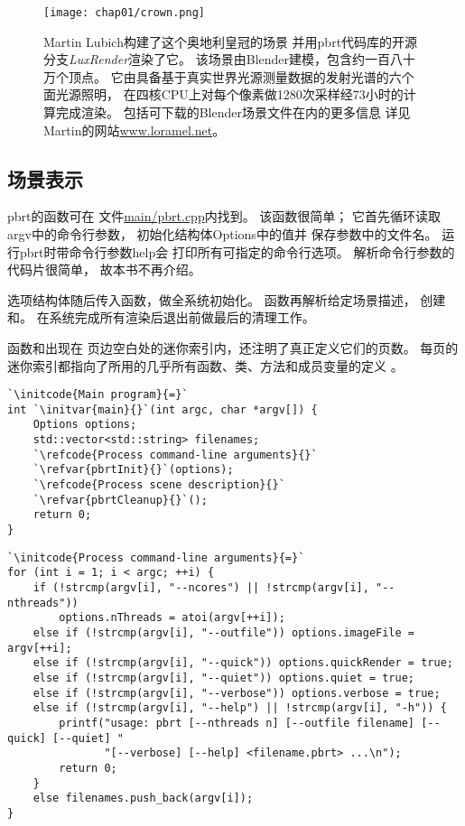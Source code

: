 \begin{figure}[htbp]
    \centering\texttt{[image: chap01/crown.png]}
    \caption{Martin Lubich构建了这个奥地利皇冠的场景
        并用pbrt代码库的开源分支\emph{LuxRender}渲染了它。
        该场景由Blender建模，包含约一百八十万个顶点。
        它由具备基于真实世界光源测量数据的发射光谱的六个面光源照明，
        在四核CPU上对每个像素做1280次采样经73小时的计算完成渲染。
        包括可下载的Blender场景文件在内的更多信息
        详见Martin的网站\url{www.loramel.net}。}
    \label{fig:1.16}
\end{figure}

\subsection{场景表示}\label{sub:场景表示}
pbrt的函数可在
文件\href{https://github.com/mmp/pbrt-v3/tree/master/src/main/pbrt.cpp}{\ttfamily main/pbrt.cpp}内找到。
该函数很简单；
它首先循环读取{\ttfamily argv}中的命令行参数，
初始化结构体{\ttfamily Options}中的值并
保存参数中的文件名。
运行pbrt时带命令行参数{\ttfamily {-}{-}help}会
打印所有可指定的命令行选项。
解析命令行参数的代码片很简单，
故本书不再介绍。

选项结构体随后传入函数，做全系统初始化。
函数再解析给定场景描述，
创建和。
在系统完成所有渲染后退出前做最后的清理工作。

函数和出现在
页边空白处的迷你索引内，还注明了真正定义它们的页数。
每页的迷你索引都指向了所用的几乎所有函数、类、方法和成员变量的定义
。
\begin{lstlisting}
`\initcode{Main program}{=}`
int `\initvar{main}{}`(int argc, char *argv[]) {
    Options options;
    std::vector<std::string> filenames;
    `\refcode{Process command-line arguments}{}`
    `\refvar{pbrtInit}{}`(options);
    `\refcode{Process scene description}{}`
    `\refvar{pbrtCleanup}{}`();
    return 0;
}
\end{lstlisting}
\begin{lstlisting}
`\initcode{Process command-line arguments}{=}`
for (int i = 1; i < argc; ++i) {
    if (!strcmp(argv[i], "--ncores") || !strcmp(argv[i], "--nthreads"))
        options.nThreads = atoi(argv[++i]);
    else if (!strcmp(argv[i], "--outfile")) options.imageFile = argv[++i];
    else if (!strcmp(argv[i], "--quick")) options.quickRender = true;
    else if (!strcmp(argv[i], "--quiet")) options.quiet = true;
    else if (!strcmp(argv[i], "--verbose")) options.verbose = true;
    else if (!strcmp(argv[i], "--help") || !strcmp(argv[i], "-h")) {
        printf("usage: pbrt [--nthreads n] [--outfile filename] [--quick] [--quiet] "
               "[--verbose] [--help] <filename.pbrt> ...\n");
        return 0;
    }
    else filenames.push_back(argv[i]);
}
\end{lstlisting}

